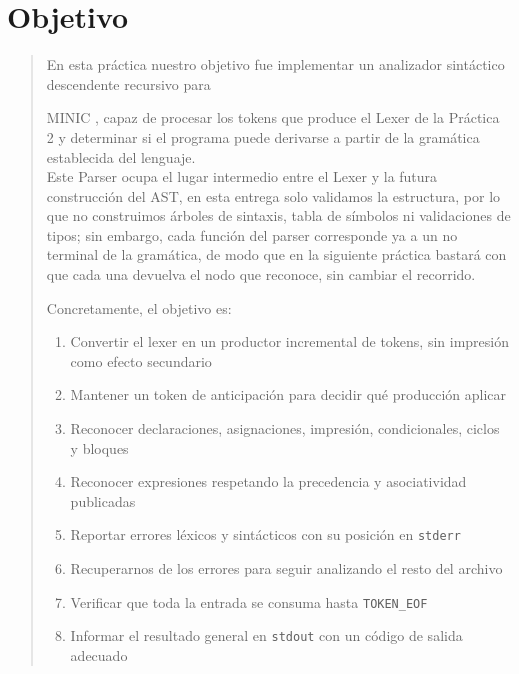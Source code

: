 \documentclass[12pt,letterpaper]{article}
\newcommand{\minic}{
  {M\footnotesize INI\normalsize C}
}
\begin{document}
\thispagestyle{empty}


\newpage

\section*{Objetivo}

\begin{quote}
  En esta práctica nuestro objetivo fue implementar un analizador sintáctico descendente recursivo para
  \minic, capaz de procesar los tokens que produce el Lexer de la Práctica 2 y determinar si el programa puede
  derivarse a partir de la gramática establecida del lenguaje.\\

  Este Parser ocupa el lugar intermedio entre el Lexer y la futura construcción del AST, en esta entrega solo
  validamos la estructura, por lo que no construimos árboles de sintaxis, tabla de símbolos ni validaciones de
  tipos; sin embargo, cada función del parser corresponde ya a un no terminal de la gramática, de modo que en
  la siguiente práctica bastará con que cada una devuelva el nodo que reconoce, sin cambiar el recorrido.

  Concretamente, el objetivo es:

  \begin{enumerate}[label=\arabic*.]
  \item Convertir el lexer en un productor incremental de tokens, sin impresión como efecto secundario
  \item Mantener un token de anticipación para decidir qué producción aplicar
  \item Reconocer declaraciones, asignaciones, impresión, condicionales, ciclos y bloques
  \item Reconocer expresiones respetando la precedencia y asociatividad publicadas
  \item Reportar errores léxicos y sintácticos con su posición en \texttt{stderr}
  \item Recuperarnos de los errores para seguir analizando el resto del archivo
  \item Verificar que toda la entrada se consuma hasta \texttt{TOKEN\_EOF}
  \item Informar el resultado general en \texttt{stdout} con un código de salida adecuado
  \end{enumerate}
\end{quote}
\end{document}

